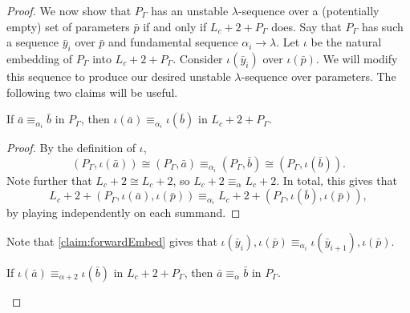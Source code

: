 \documentclass[11pt]{amsart}
\theoremstyle{remark}
\begin{document}
\begin{proof}
    We now show that $P_\Gamma$ has an unstable $\lambda$-sequence over a (potentially empty) set of parameters $\bar{p}$ if and only if $L_c+2+P_\Gamma$ does.
    Say that $P_\Gamma$ has such a sequence $\bar{y}_i$ over $\bar{p}$ and fundamental sequence $\alpha_i\to\lambda$.
    Let $\iota$ be the natural embedding of $P_\Gamma$ into $L_c+2+P_\Gamma$.
    Consider $\iota(\bar{y}_{i})$ over $\iota(\bar{p})$.
    We will modify this sequence to produce our desired unstable $\lambda$-sequence over parameters. The following two claims will be useful.

    \begin{claim}\label{claim:forwardEmbed}
    If $\bar{a}\equiv_{\alpha_i}\bar{b}$ in $P_\Gamma$, then $\iota(\bar{a})\equiv_{\alpha_i}\iota(\bar{b})$ in $L_c+2+P_\Gamma$.
    \end{claim}

    \begin{proof}
        By the definition of $\iota$,
        \[(P_\Gamma,\iota(\bar{a}))\cong (P_\Gamma,\bar{a})\equiv_{\alpha_i} (P_\Gamma,\bar{b})\cong(P_\Gamma,\iota(\bar{b})).\]
        Note further that $L_c+2\cong L_c+2$, so  $L_c+2\equiv_{\alpha} L_c+2$.
        In total, this gives that 
        \[L_c+2+(P_\Gamma,\iota(\bar{a}),\iota(\bar{p}))\equiv_{\alpha_i} L_c+2+(P_\Gamma,\iota(\bar b),\iota(\bar{p})),\]
    by playing independently on each summand.
    \end{proof}

    Note that \cref{claim:forwardEmbed} gives that $\iota(\bar{y}_{i}),\iota(\bar{p})\equiv_{\alpha_i} \iota(\bar{y}_{i+1}),\iota(\bar{p})$.

    \begin{claim}\label{claim:backwardEmbed}
    If $\iota(\bar{a})\equiv_{\alpha+2}\iota(\bar b)$ in $L_c+2+P_\Gamma$, then $\bar a \equiv_\alpha \bar b$ in $P_\Gamma$.
    \end{claim}


\end{proof}
\end{document}
